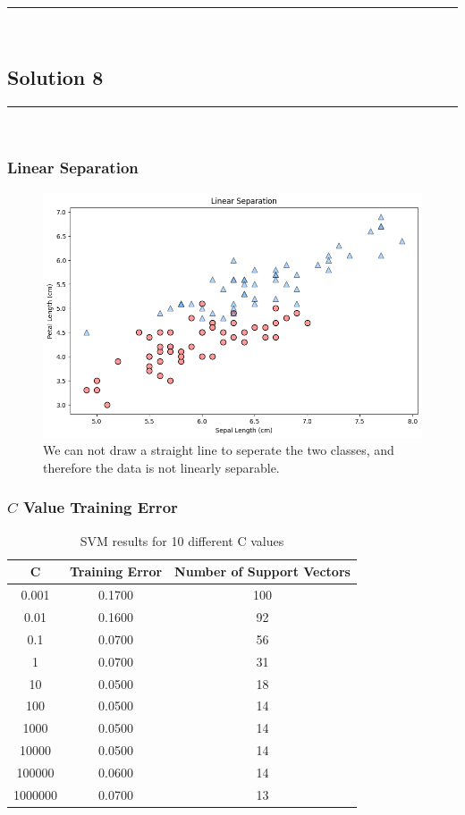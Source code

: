 \documentclass{article}
\begin{document}
{\noindent\rule{\textwidth}{0.4pt}\\

\newpage

\subsection*{Solution 8}

\noindent\rule{\textwidth}{0.4pt}\\

\subsubsection*{Linear Separation}
\begin{figure}[H]
\includegraphics[width=1\textwidth]{hw6_q8_a.png} 
\caption{We can not draw a straight line to seperate the two classes, and therefore the data is not linearly separable.} 
\end{figure}
\subsubsection*{$C$ Value Training Error}
\begin{table}[h]
\centering
\begin{tabular}{ccc}
\toprule
C & Training Error & Number of Support Vectors \\
\midrule
0.001 & 0.1700 & 100 \\
0.01 & 0.1600 & 92 \\
0.1 & 0.0700 & 56 \\
1 & 0.0700 & 31 \\
10 & 0.0500 & 18 \\
100 & 0.0500 & 14 \\
1000 & 0.0500 & 14 \\
10000 & 0.0500 & 14 \\
100000 & 0.0600 & 14 \\
1000000 & 0.0700 & 13 \\
\bottomrule
\end{tabular}
\caption{SVM results for 10 different C values}
\label{tab:svm_results}
\end{table}

}
\end{document}
